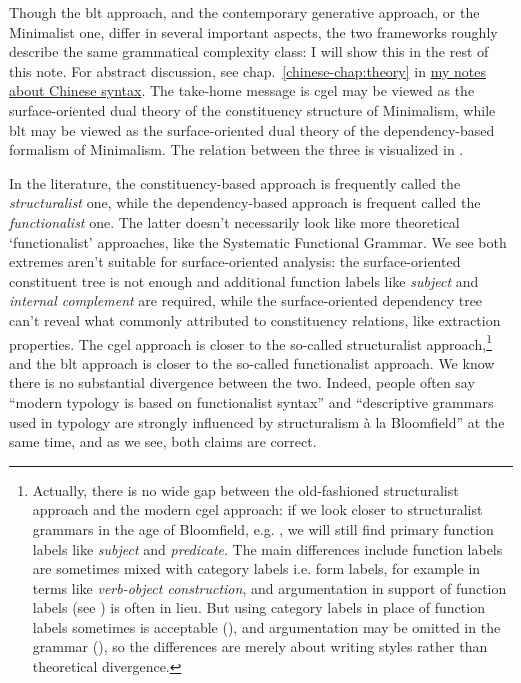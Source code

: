 \documentclass[UTF8, a4paper, oneside, scheme=plain]{ctexart}
\newcommand*{\citechap}[1]{chap.~{#1}}
\newcommand*{\term}[1]{\emph{#1}}
\newcommand{\chinesenote}{\href{../Chinese/main.pdf}{my notes about Chinese syntax}}
\newcommand{\ala}{à la}
\begin{document}
Though the \ac{blt} approach, and the contemporary generative approach, or the Minimalist one,
differ in several important aspects,
the two frameworks roughly describe the same grammatical complexity class:
I will show this in the rest of this note. 
For abstract discussion, see \citechap{\ref{chinese-chap:theory}} in \chinesenote. 
The take-home message is
\ac{cgel} may be viewed as the surface-oriented dual theory of the constituency structure of Minimalism,
while \ac{blt} may be viewed as the surface-oriented dual theory of the dependency-based formalism of Minimalism.
The relation between the three is visualized in .

In the literature, the constituency-based approach is frequently called the \emph{structuralist} one,
while the dependency-based approach is frequent called the \emph{functionalist} one.
The latter doesn't necessarily look like more theoretical `functionalist' approaches,
like the Systematic Functional Grammar.
We see both extremes aren't suitable for surface-oriented analysis:
the surface-oriented constituent tree is not enough
and additional function labels like \term{subject} and \term{internal complement}
are required,
while the surface-oriented dependency tree 
can't reveal what commonly attributed to constituency relations,
like extraction properties.
The \ac{cgel} approach is closer to the so-called structuralist approach,\footnote{
    Actually, there is no wide gap between the old-fashioned structuralist approach 
    and the modern \ac{cgel} approach:
    if we look closer to structuralist grammars in the age of Bloomfield,
    e.g. \citet{chao1965grammar},
    we will still find primary function labels like \term{subject} and \term{predicate}.
    The main differences include function labels are sometimes mixed with category labels i.e. form labels,
    for example in terms like \term{verb-object construction},
    and argumentation in support of function labels (see )
    is often in lieu.
    But using category labels in place of function labels sometimes is acceptable 
    (),
    and argumentation may be omitted in the grammar (),
    so the differences are merely about writing styles rather than theoretical divergence.
}
and the \ac{blt} approach is closer to the so-called functionalist approach.
We know there is no substantial divergence between the two.
Indeed, people often say 
``modern typology is based on functionalist syntax''
and ``descriptive grammars used in typology are strongly influenced by structuralism \ala{} Bloomfield''
at the same time,
and as we see, both claims are correct.
\end{document}
